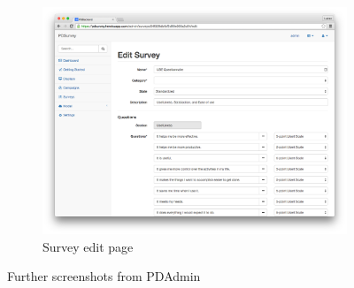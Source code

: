 \begin{figure}[h]
        \hfill
        \begin{subfigure}{0.55\textwidth}
            \centering
            \includegraphics[width=\columnwidth]{img/screenshots/pdadmin/surveys.png}
            \caption{Survey edit page}
            \label{screenshot:pdadmin-surveys}
        \end{subfigure}
        \caption{Further screenshots from PDAdmin}
    \end{figure}


